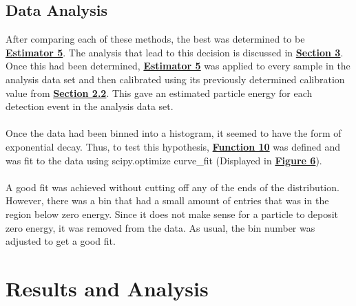\documentclass[
	letterpaper, %
	10pt, %
]{template}
\newcommand{\bref}[2]{\textbf{\hyperref[#1]{#2}}}
\begin{document}
\subsection{Data Analysis}
After comparing each of these methods, the best was determined to be \textbf{\hyperref[est-5]{Estimator 5}}. The analysis that lead to this decision is discussed in \textbf{\hyperref[sec::res]{Section 3}}. Once this had been determined, \textbf{\hyperref[est-5]{Estimator 5}} was applied to every sample in the analysis data set and then calibrated using its previously determined calibration value from \bref{sec::method-calibration}{Section 2.2}. This gave an estimated particle energy for each detection event in the analysis data set.\\\\
Once the data had been binned into a histogram, it seemed to have the form of exponential decay. Thus, to test this hypothesis, \textbf{\hyperref[lst-10]{Function 10}} was defined and was fit to the data using scipy.optimize curve\_fit (Displayed in \textbf{\hyperref[fig::6]{Figure 6}}).\\\\
A good fit was achieved without cutting off any of the ends of the distribution. However, there was a bin that had a small amount of entries that was in the region below zero energy. Since it does not make sense for a particle to deposit zero energy, it was removed from the data. As usual, the bin number was adjusted to get a good fit.
\section{Results and Analysis}\label{sec::res}
\end{document}
